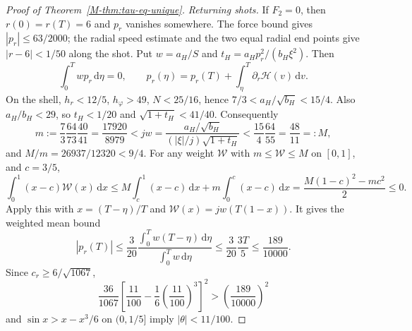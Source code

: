 \documentclass[aip,jmp,amsmath,amssymb,reprint]{revtex4-2}
\newcommand{\dd}{\mathrm{d}}
\theoremstyle{plain}
\theoremstyle{definition}
\begin{document}
\begin{proof}[Proof of Theorem~\ref{M-thm:tau-eq-unique}]
\emph{Returning shots.} If $F_2=0$, then $r(0)=r(T)=6$ and $p_r$ vanishes
somewhere. The force bound gives $|p_r|\le63/2000$; the radial speed estimate
and the two equal radial end points give $|r-6|<1/50$ along the shot.
Put $w=a_H/S$ and $t_H=a_Hp_r^2/(b_H\xi^2)$. Then
\[
 \int_0^Tw p_r\,\dd\eta=0,\qquad
 p_r(\eta)=p_r(T)+\int_\eta^T\partial_r\mathcal H(v)\,\dd v.
\]
On the shell, $h_r<12/5$, $h_\varphi>49$, $N<25/16$, hence
$7/3<a_H/\sqrt{b_H}<15/4$. Also $a_H/b_H<29$, so $t_H<1/20$
and $\sqrt{1+t_H}<41/40$. Consequently
\[
 m:=\frac73\frac{64}{73}\frac{40}{41}=\frac{17920}{8979}
 <jw=\frac{a_H/\sqrt{b_H}}{(|\xi|/j)\sqrt{1+t_H}}
 <\frac{15}{4}\frac{64}{55}=\frac{48}{11}=:M,
\]
and $M/m=26937/12320<9/4$.
For any weight $\mathcal W$ with $m\le\mathcal W\le M$ on $[0,1]$,
and $c=3/5$,
\[
 \int_0^1(x-c)\mathcal W(x)\,\dd x
 \le M\int_c^1(x-c)\,\dd x+m\int_0^c(x-c)\,\dd x
 =\frac{M(1-c)^2-mc^2}{2}\le0.
\]
Apply this with $x=(T-\eta)/T$ and $\mathcal W(x)=jw(T(1-x))$.
It gives the weighted mean bound
\[
 |p_r(T)|\le\frac3{20}
 \frac{\int_0^Tw(T-\eta)\,\dd\eta}{\int_0^Tw\,\dd\eta}
 \le\frac3{20}\frac{3T}{5}\le\frac{189}{10000}.
\]
Since $c_r\ge6/\sqrt{1067}$,
\[
 \frac{36}{1067}\left[\frac{11}{100}
       -\frac16\left(\frac{11}{100}\right)^3\right]^2
 >\left(\frac{189}{10000}\right)^2
\]
and $\sin x>x-x^3/6$ on $(0,1/5]$ imply $|\theta|<11/100$.


\end{proof}
\end{document}
